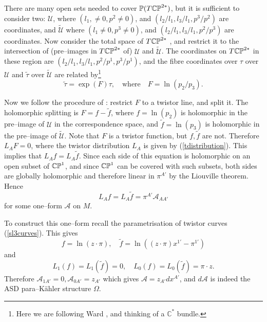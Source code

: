  There are many open sets needed to cover
$\mathbb{P}(T\mathbb{CP}^{2*})$, but it is sufficient to consider two:
$\mathcal{U}$, where $(l_1, \neq 0, p^2\neq 0)$, and $(l_2/l_1, l_3/l_1, p^3/p^2)$ are coordinates, and $\widetilde{\mathcal{U}}$ where
$(l_1\neq 0, p^3\neq 0)$, and  $(l_2/l_1, l_3/l_1, p^2/p^3)$
are coordinates. Now consider the total
space of $T\mathbb{CP}^{2*}$%
, and restrict it to the intersection of (pre--images in
$T\mathbb{CP}^{2*}$
of) $\mathcal{U}$ and $\widetilde{\mathcal{U}}$. The coordinates on $T\mathbb{CP}^{2*}$ in these
region are $(l_2/l_1, l_3/l_1, p^2/p^1, p^3/p^1)$, and the fibre
coordinates over $\tau$ over $\mathcal{U}$ and $\tilde{\tau}$ over 
$\widetilde{\mathcal{U}}$ are related by\footnote{Here we are following Ward \cite{wardtf},
and thinking of a $\mathbb{C}^*$ bundle.}
\[
\tilde \tau=\exp(F)\tau, \quad\mbox{where}\quad  
F=\ln{(p_2/p_3)}.
\]

Now we follow the procedure of \cite{wardtf}: restrict $F$ to a twistor line,
and split it.
The holomorphic splitting is $F=f-\widetilde{f}$, where
$f=\ln{(p_2)}$ is holomorphic in the pre--image of $\mathcal{U}$ in the correspondence space, and 
$\widetilde{f}=\ln{(p_3)}$ is holomorphic in the pre--image of
$\widetilde{\mathcal{U}}$. Note that $F$ is a twistor  function, but 
$f, \widetilde{f}$ are not. Therefore
$L_{A}F=0$, where the twistor distribution $L_{A}$
is given by (\ref{tdistribution}). This implies that $L_{A}f=L_{A}\widetilde{f}$. Since each side of this equation is holomorphic on an open subset of $\mathbb{CP}^1$, and since $\mathbb{CP}^1$ can be covered with such subsets, both sides are globally holomorphic and therefore linear in $\pi^{A'}$ by the Liouville theorem. Hence
\[
L_{A}f=L_{A}\widetilde{f}=\pi^{A'}\mathcal{A}_{AA'}
\]
for some one--form $\mathcal{A}$ on $M$.

To construct this one--form recall the parametrisation
of twistor curves (\ref{sl3curves}). This gives
\[
f=\ln{(z\cdot\pi)}, \quad\widetilde{f}=\ln{((z\cdot\pi)x^{1'}-\pi^{1'})}
\]
and
\[
L_{1}(f)=L_{1}(\widetilde{f})=0, \quad
L_{0}(f)=L_{0}(\widetilde{f})=\pi\cdot z.
\]
Therefore ${\mathcal A}_{1A'}=0, {\mathcal A}_{0A'}=z_{A'}$
which gives ${\mathcal A}=z_{A'}dx^{A'}$, and $d{\mathcal A}$
is indeed the ASD para--K\"ahler structure $\Omega$.
\koniec
